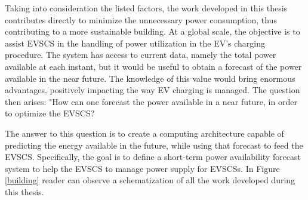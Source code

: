


 
Taking into consideration the listed factors, the work developed in this thesis contributes directly to minimize the unnecessary power consumption, thus contributing to a more sustainable building. At a global scale, the objective is to assist \ac{EVSCS} in the handling of power utilization in the  \ac{EV}'s charging procedure. The system has access to current data, namely the total power available at each instant, but it would be useful to obtain a forecast of the power available in the near future. The knowledge of this value would bring enormous advantages, positively impacting the way \ac{EV} charging is managed. The question then arises: "How can one forecast the power available in a near future, in order to optimize the \ac{EVSCS}?


The answer to this question is to create a computing architecture capable of predicting the energy available in the future, while using that forecast to feed the \ac{EVSCS}. Specifically, the goal is to define a short-term power availability forecast system to help the \ac{EVSCS} to manage power supply for \ac{EVSCSs}. In Figure \ref{building} reader can observe a schematization of all the work developed during this thesis. 

